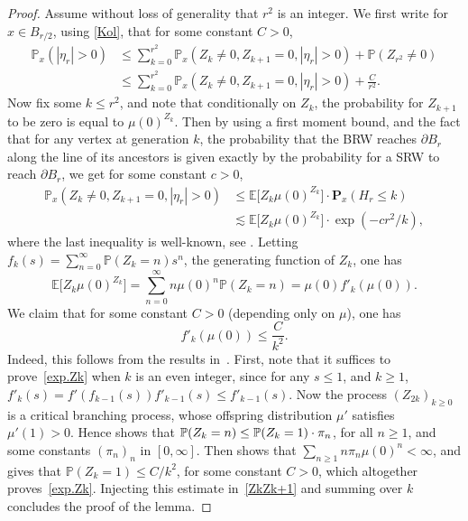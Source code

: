 \documentclass[JEP,XML,SOM,Unicode,NoFloatCountersInSection,published]{cedram}
\theoremstyle{plain}
\theoremstyle{definition}
\newcommand{\1}{{\text{\Large $\mathfrak 1$}}}
\begin{document}
\begin{proof}
Assume without loss of generality that $r^2$ is an integer. We first write for $x\in B_{r/2}$, using \eqref{Kol}, that for some constant $C>0$,
\begin{align*}
\mathbb P_x(|\eta_r| >0 ) & \le \sum_{k=0}^{r^2} \mathbb P_x(Z_k\neq 0, Z_{k+1}=0, |\eta_r|>0) + \mathbb P(Z_{r^2} \neq 0) \\
& \le\sum_{k=0}^{r^2} \mathbb P_x(Z_k\neq 0, Z_{k+1}=0, |\eta_r|>0) + \frac{C}{r^2}.
\end{align*}
Now fix some $k\le r^2$, and note that conditionally on $Z_k$, the probability for $Z_{k+1}$ to be zero is equal to $\mu(0)^{Z_k}$. Then by using a first moment bound, and the fact that for any vertex at generation $k$, the probability that the BRW reaches $\partial B_r$ along the line of its ancestors is given exactly by the probability for a SRW to reach $\partial B_r$, we get for some constant $c>0$,
\begin{align} \label{ZkZk+1}
\nonumber \mathbb P_x(Z_k\neq 0, Z_{k+1}=0, |\eta_r|>0) & \le \mathbb E\big[Z_k \mu(0)^{Z_k}\big]\cdot \mathbf P_x(H_r\le k) \\
& \lesssim \mathbb E\big[Z_k \mu(0)^{Z_k}\big]\cdot \exp(-cr^2/k),
\end{align}
where the last inequality is well-known, see \eg \cite[Prop.\,2.1.2]{LL10}. Letting $f_k(s) = \sum_{n=0}^\infty \mathbb P(Z_k=n)s^n$, the generating function of $Z_k$, one has
\[
\mathbb E\big[Z_k \mu(0)^{Z_k}\big] = \sum_{n=0}^\infty n\mu(0)^n \mathbb P(Z_k=n) = \mu(0) f'_k(\mu(0)).
\]
We claim that for some constant $C>0$ (depending only on $\mu$), one has
\begin{equation}\label{exp.Zk}
f'_k(\mu(0)) \le \frac C{k^2}.
\end{equation}
Indeed, this follows from the results in~\cite{AN}. First, note that it suffices to prove~\eqref{exp.Zk} when $k$ is an even integer, since for any $s\le 1$, and $k\ge 1$, $f'_k(s) = f'(f_{k-1}(s)) f'_{k-1}(s)\le f'_{k-1}(s)$.
Now the process $(Z_{2k})_{k\ge 0}$ is a critical branching process, whose offspring distribution $\mu'$ satisfies $\mu'(1) >0$.
Hence \cite[Lem.\,2 p.\,12]{AN} shows that $\mathbb P(Z_k=\nobreak n) \le \mathbb P(Z_k=1)\cdot \pi_n$, for all $n\ge 1$, and some constants $(\pi_n)_n$ in $[0,\infty]$. Then \cite[Th.\,2 p.\,13]{AN} shows that $\sum_{n\ge 1} n\pi_n\mu(0)^n <\infty$, and \cite[Cor.\,2 p.\,23]{AN} gives that $\mathbb P(Z_k=1) \le C/k^2$, for some constant $C>0$, which altogether proves~\eqref{exp.Zk}. Injecting this estimate in~\eqref{ZkZk+1} and summing over $k$ concludes the proof of the lemma.
\end{proof}
\end{document}
